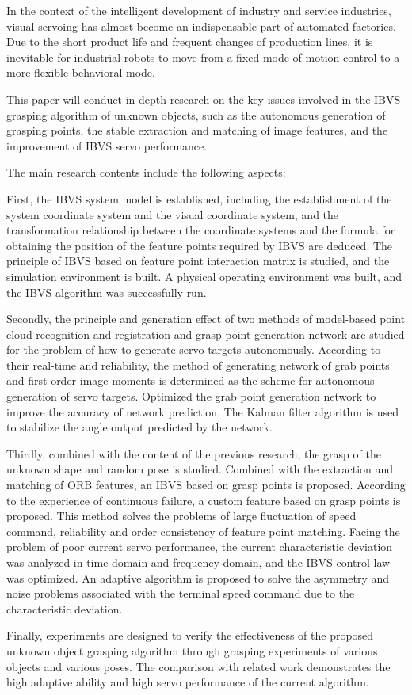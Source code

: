\begin{eabstract}
   In the context of the intelligent development of industry and service industries, visual servoing has almost become an indispensable part of automated factories. Due to the short product life and frequent changes of production lines, it is inevitable for industrial robots to move from a fixed mode of motion control to a more flexible behavioral mode.
   
   
   This paper will conduct in-depth research on the key issues involved in the IBVS grasping algorithm of unknown objects, such as the autonomous generation of grasping points, the stable extraction and matching of image features, and the improvement of IBVS servo performance.
   
   
   The main research contents include the following aspects:
   
   
   First, the IBVS system model is established, including the establishment of the system coordinate system and the visual coordinate system, and the transformation relationship between the coordinate systems and the formula for obtaining the position of the feature points required by IBVS are deduced. The principle of IBVS based on feature point interaction matrix is ​​studied, and the simulation environment is built. A physical operating environment was built, and the IBVS algorithm was successfully run.
   
   
   Secondly, the principle and generation effect of two methods of model-based point cloud recognition and registration and grasp point generation network are studied for the problem of how to generate servo targets autonomously. According to their real-time and reliability, the method of generating network of grab points and first-order image moments is determined as the scheme for autonomous generation of servo targets. Optimized the grab point generation network to improve the accuracy of network prediction. The Kalman filter algorithm is used to stabilize the angle output predicted by the network.
   
   
   Thirdly, combined with the content of the previous research, the grasp of the unknown shape and random pose is studied. Combined with the extraction and matching of ORB features, an IBVS based on grasp points is proposed. According to the experience of continuous failure, a custom feature based on grasp points is proposed. This method solves the problems of large fluctuation of speed command, reliability and order consistency of feature point matching. Facing the problem of poor current servo performance, the current characteristic deviation was analyzed in time domain and frequency domain, and the IBVS control law was optimized. An adaptive algorithm is proposed to solve the asymmetry and noise problems associated with the terminal speed command due to the characteristic deviation.


	Finally, experiments are designed to verify the effectiveness of the proposed unknown object grasping algorithm through grasping experiments of various objects and various poses. The comparison with related work demonstrates the high adaptive ability and high servo performance of the current algorithm.
\end{eabstract}

